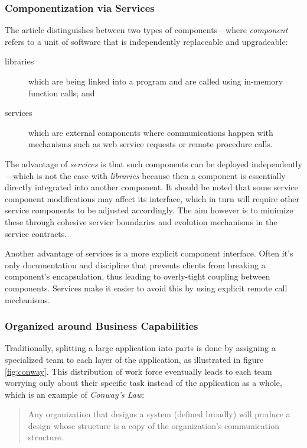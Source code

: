 \subsubsection{Componentization via Services}

The article \cite{ms-definition} distinguishes between two types of
components---where \textit{component} refers to a unit of software
that is independently replaceable and upgradeable:

\begin{description}
	\item[libraries] which are being linked into a program and are
		called using in-memory function calls; and
	\item[services] which are external components where communications
		happen with mechanisms such as web service requests or remote
		procedure calls.
\end{description}

The advantage of \textit{services} is that such components can be
deployed independently---which is not the case with \textit{libraries}
because then a component is essentially directly integrated into
another component. It should be noted that some service component
modifications may affect its interface, which in turn will require
other service components to be adjusted accordingly. The aim however
is to minimize these through cohesive service boundaries and evolution
mechanisms in the service contracts.

Another advantage of services is a more explicit component interface.
Often it's only documentation and discipline that prevents clients
from breaking a component's encapsulation, thus leading to
overly-tight coupling between components. Services make it easier to
avoid this by using explicit remote call mechanisms.

\subsubsection{Organized around Business Capabilities}

Traditionally, splitting a large application into parts is done by
assigning a specialized team to each layer of the application, as
illustrated in figure \ref{fig:conway}. This distribution of work force
eventually leads to each team worrying only about their specific task
instead of the application as a whole, which is an example of
\textit{Conway's Law}:  

\begin{quote}
	Any organization that designs a system (defined broadly) will
	produce a design whose structure is a copy of the organization's
	communication structure.  
\end{quote}

